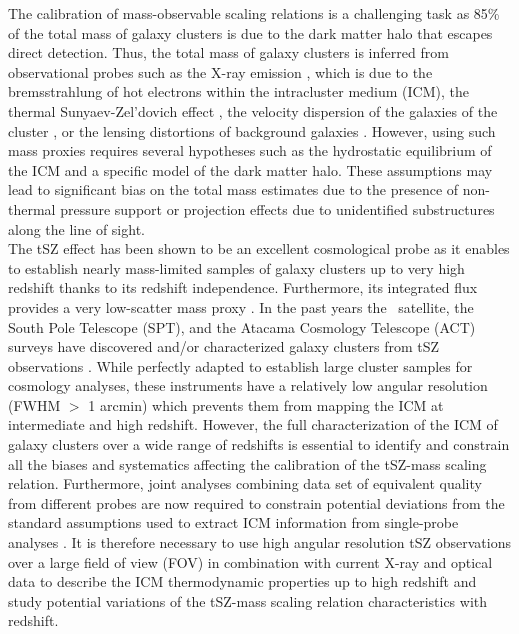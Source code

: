 \documentclass[traditabstract]{aa}
\begin{document}
\indent The calibration of mass-observable scaling relations is a challenging task as 85\% of the total mass of galaxy clusters is due to the dark matter halo that escapes direct detection. Thus, the total mass of galaxy clusters is inferred from observational probes such as the X-ray emission \citep[\emph{e.g.,}][]{vik06,pra09}, which is due to the bremsstrahlung of hot electrons within the intracluster medium (ICM), the thermal Sunyaev-Zel’dovich effect \citep[tSZ;][]{sun72}, the velocity dispersion of the galaxies of the cluster \citep[\emph{e.g.,}][]{biv06,sif16}, or the lensing distortions of background galaxies \citep[\emph{e.g.,}][]{app14,ume14,hoe15}. However, using such mass proxies requires several hypotheses such as the hydrostatic equilibrium of the ICM and a specific model of the dark matter halo. These assumptions may lead to significant bias on the total mass estimates due to the presence of non-thermal pressure support \citep[\emph{e.g.,} gas turbulence due to merging events and feedback from active galactic nuclei, ][]{mar16} or projection effects \citep[\emph{e.g.,}][]{clo04} due to unidentified substructures along the line of sight.\\
\indent The tSZ effect has been shown to be an excellent cosmological probe as it enables to establish nearly mass-limited samples of galaxy clusters up to very high redshift \citep[\emph{e.g.,}][]{pla16c} thanks to its redshift independence. Furthermore, its integrated flux provides a very low-scatter mass proxy \citep[\emph{e.g.,}][]{pla11}. In the past years the \planck\ satellite, the South Pole Telescope (SPT), and the Atacama Cosmology Telescope (ACT) surveys have discovered and/or characterized galaxy clusters from tSZ observations \citep[\emph{e.g.,}][]{pla16c,ble15,has13}. While perfectly adapted to establish large cluster samples for cosmology analyses, these instruments have a relatively low angular resolution (FWHM $>$ 1 arcmin) which prevents them from mapping the ICM at intermediate and high redshift. However, the full characterization of the ICM of galaxy clusters over a wide range of redshifts is essential to identify and constrain all the biases and systematics affecting the calibration of the tSZ-mass scaling relation. Furthermore, joint analyses combining data set of equivalent quality from different probes are now required to constrain potential deviations from the standard assumptions used to extract ICM information from single-probe analyses \citep[\emph{e.g.,}][]{sie16}. It is therefore necessary to use high angular resolution tSZ observations over a large field of view (FOV) in combination with current X-ray and optical data to describe the ICM thermodynamic properties up to high redshift and study potential variations of the tSZ-mass scaling relation characteristics with redshift.\\
\end{document}
